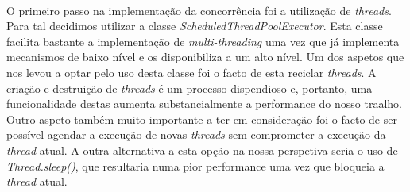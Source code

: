 \documentclass[11pt,oneside]{book}
\begin{document}
\paragraph{}
    O primeiro passo na implementação da concorrência foi a utilização de
    \textit{threads}. Para tal decidimos utilizar a classe 
    \textit{ScheduledThreadPoolExecutor}. Esta classe facilita bastante a 
    implementação de \textit{multi-threading} uma vez que já implementa mecanismos
    de baixo nível e os disponibiliza a um alto nível. Um dos aspetos que nos
    levou a optar pelo uso desta classe foi o facto de esta reciclar 
    \textit{threads}. A criação e destruição de \textit{threads} é um processo
    dispendioso e, portanto, uma funcionalidade destas aumenta substancialmente a
    performance do nosso traalho. Outro aspeto também muito importante a ter em
    consideração foi o facto de ser possível agendar a execução de novas 
    \textit{threads} sem comprometer a execução da \textit{thread} atual. A outra
    alternativa a esta opção na nossa perspetiva seria o uso de 
    \textit{Thread.sleep()}, que resultaria numa pior performance uma vez que bloqueia
    a \textit{thread} atual.
\end{document}
